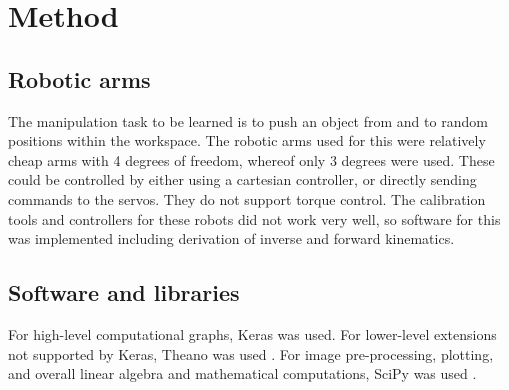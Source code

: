 \section{Method}

\subsection{Robotic arms}

The manipulation task to be learned is to push an object from and to random
positions within the workspace. The robotic arms used for this were relatively
cheap arms with 4 degrees of freedom, whereof only 3 degrees were used. These
could be controlled by either using a cartesian controller, or directly sending
commands to the servos. They do not support torque control. The calibration
tools and controllers for these robots did not work very well, so software for
this was implemented including derivation of inverse and forward kinematics.

\subsection{Software and libraries}

For high-level computational graphs, Keras \cite{chollet2015keras} was used.
For lower-level extensions not supported by Keras, Theano was used
\cite{theano2016theano}. For image pre-processing, plotting, and overall linear
algebra and mathematical computations, SciPy was used \cite{scipy2016scipy}.
